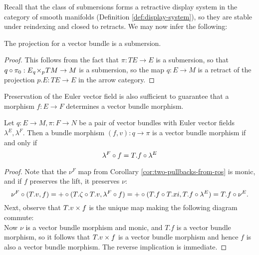 Recall that the class of submersions forms a retractive display system in the category of smooth manifolds (Definition \ref{def:display-system}), so they are stable under reindexing and closed to retracts.
We may now infer the following:
\begin{corollary}
  The projection for a vector bundle is a submersion.
\end{corollary}
\begin{proof}
  This follows from the fact that $\pi:TE \to E$ is a submersion, so that $q \circ \pi_0: E {_{q}}\!\times_{p}\! TM \to M$ is a submersion, so the map $q:E \to M$ is a retract of the projection $p.E:TE \to E$ in the arrow category.
\end{proof}
Preservation of the Euler vector field is also sufficient to guarantee that a morphism $f:E \to F$ determines a vector bundle morphism.
\begin{proposition}%
  \label{prop:evf-is-ff}
  Let $q: E \to M, \pi: F \to N$ be a pair of vector bundles with Euler vector fields $\lambda^E,\lambda^F$.
  Then a bundle morphism $(f,v):q \to \pi$ is a vector bundle morphism if and only if \[\lambda^F \circ f = T.f \circ \lambda^E\]
\end{proposition}
\begin{proof}
  Note that the $\nu^F$ map from Corollary \ref{cor:two-pullbacks-from-ros} is monic, and if $f$ preserves the lift, it preserves $\nu$:
  \[
    \nu^F \circ (T.v, f) = + \circ (T.\zeta \circ T.v, \lambda^F \circ f) = + \circ (T.f \circ T.xi, T.f \circ \lambda^E) = T.f \circ \nu^E. 
  \]
  Next, observe that $T.v \times f$ is the unique map making the following diagram commute:
  \[\] 
  Now $\nu$ is a vector bundle morphism and monic, and $T.f$ is a vector bundle morphism, so it follows that $T.v \times f$ is a vector bundle morphism and hence $f$ is also a vector bundle morphism. The reverse implication is immediate.
\end{proof}



